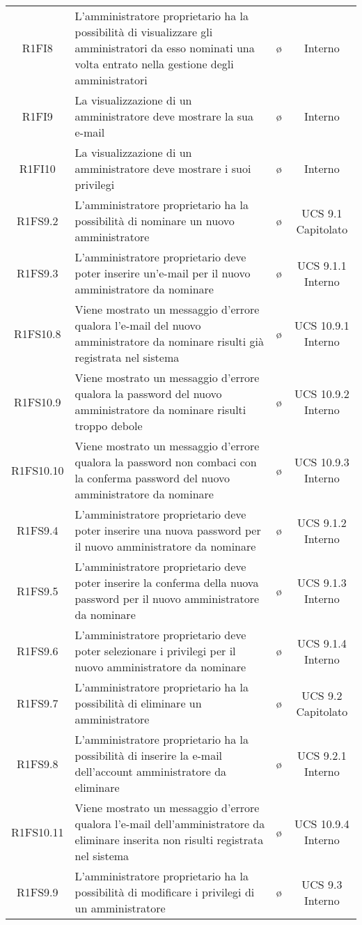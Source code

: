 {\begin{longtable}{ c C{4cm} c c}
R1FI8 & L'amministratore proprietario ha la possibilità di visualizzare gli amministratori da esso nominati una volta entrato nella gestione degli amministratori & \o & Interno \\
R1FI9 & La visualizzazione di un amministratore deve mostrare la sua e-mail & \o & Interno \\
R1FI10 & La visualizzazione di un amministratore deve mostrare i suoi privilegi & \o & Interno \\
R1FS9.2 & L'amministratore proprietario ha la possibilità di nominare un nuovo amministratore & \o & UCS 9.1 Capitolato\\
R1FS9.3 & L'amministratore proprietario deve poter inserire un'e-mail per il nuovo amministratore da nominare & \o & UCS 9.1.1 Interno\\
R1FS10.8 & Viene mostrato un messaggio d'errore qualora l'e-mail del nuovo amministratore da nominare risulti già registrata nel sistema & \o & UCS 10.9.1 Interno\\
R1FS10.9 & Viene mostrato un messaggio d'errore qualora la password del nuovo amministratore da nominare risulti troppo debole & \o & UCS 10.9.2 Interno\\
R1FS10.10 & Viene mostrato un messaggio d'errore qualora la password non combaci con la conferma password del nuovo amministratore da nominare & \o & UCS 10.9.3 Interno\\
R1FS9.4 & L'amministratore proprietario deve poter inserire una nuova password per il nuovo amministratore da nominare & \o & UCS 9.1.2 Interno\\
R1FS9.5 & L'amministratore proprietario deve poter inserire la conferma della nuova password per il nuovo amministratore da nominare & \o & UCS 9.1.3 Interno\\
R1FS9.6 & L'amministratore proprietario deve poter selezionare i privilegi per il nuovo amministratore da nominare & \o & UCS 9.1.4 Interno\\
R1FS9.7 & L'amministratore proprietario ha la possibilità di eliminare un amministratore & \o & UCS 9.2 Capitolato\\
R1FS9.8 & L'amministratore proprietario ha la possibilità di inserire la e-mail dell'account amministratore da eliminare & \o & UCS 9.2.1 Interno\\
R1FS10.11 & Viene mostrato un messaggio d'errore qualora l'e-mail dell'amministratore da eliminare inserita non risulti registrata nel sistema & \o & UCS 10.9.4 Interno\\
R1FS9.9 & L'amministratore proprietario ha la possibilità di modificare i privilegi di un amministratore & \o & UCS 9.3 Interno\\

\end{longtable}}
